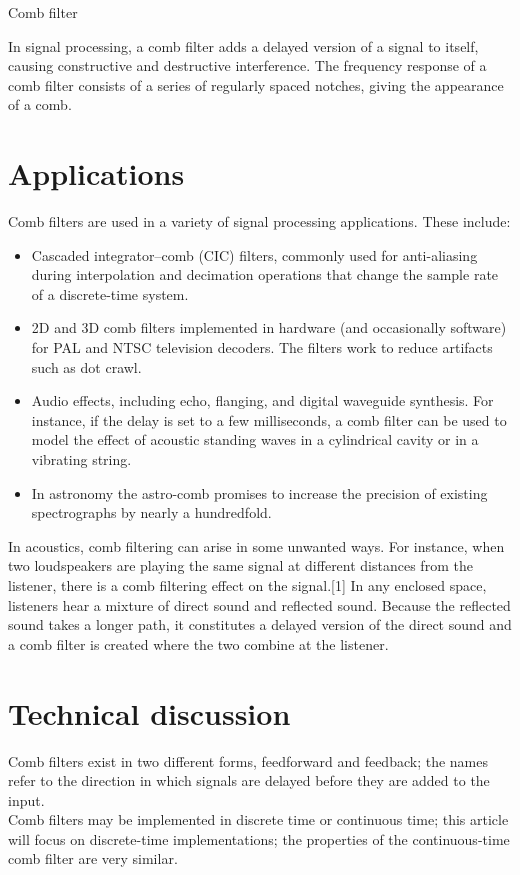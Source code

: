 \documentclass[12pt,a4paper]{article}
\begin{document}
\begin{center}
{\LARGE Comb filter}
\end{center}
In signal processing, a comb filter adds a delayed version of a signal to itself, causing constructive and destructive interference. The frequency response of a comb filter consists of a series of regularly spaced notches, giving the appearance of a comb.
\section{\Large Applications}
Comb filters are used in a variety of signal processing applications. These include:
\begin{itemize}
\item Cascaded integrator–comb (CIC) filters, commonly used for anti-aliasing during interpolation and decimation operations that change the sample rate of a discrete-time system.
\item 2D and 3D comb filters implemented in hardware (and occasionally software) for PAL and NTSC television decoders. The filters work to reduce artifacts such as dot crawl.
\item Audio effects, including echo, flanging, and digital waveguide synthesis. For instance, if the delay is set to a few milliseconds, a comb filter can be used to model the effect of acoustic standing waves in a cylindrical cavity or in a vibrating string.
\item In astronomy the astro-comb promises to increase the precision of existing spectrographs by nearly a hundredfold.
\end{itemize}
In acoustics, comb filtering can arise in some unwanted ways. For instance, when two loudspeakers are playing the same signal at different distances from the listener, there is a comb filtering effect on the signal.[1] In any enclosed space, listeners hear a mixture of direct sound and reflected sound. Because the reflected sound takes a longer path, it constitutes a delayed version of the direct sound and a comb filter is created where the two combine at the listener.
\section{\Large Technical discussion}
Comb filters exist in two different forms, feedforward and feedback; the names refer to the direction in which signals are delayed before they are added to the input.\\Comb filters may be implemented in discrete time or continuous time; this article will focus on discrete-time implementations; the properties of the continuous-time comb filter are very similar.
\end{document}
